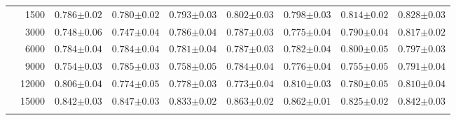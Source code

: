 \begin{table}[p]
\begin{tabularx}{\textwidth}{cr| *{7}{Y}}
        & 1500 & $0.786{\scriptscriptstyle\pm0.02}$ & $0.780{\scriptscriptstyle\pm0.02}$ & $0.793{\scriptscriptstyle\pm0.03}$ & $0.802{\scriptscriptstyle\pm0.03}$ & $0.798{\scriptscriptstyle\pm0.03}$ & $0.814{\scriptscriptstyle\pm0.02}$ & $0.828{\scriptscriptstyle\pm0.03}$ \\
        & 3000 & $0.748{\scriptscriptstyle\pm0.06}$ & $0.747{\scriptscriptstyle\pm0.04}$ & $0.786{\scriptscriptstyle\pm0.04}$ & $0.787{\scriptscriptstyle\pm0.03}$ & $0.775{\scriptscriptstyle\pm0.04}$ & $0.790{\scriptscriptstyle\pm0.04}$ & $0.817{\scriptscriptstyle\pm0.02}$ \\
        & 6000 & $0.784{\scriptscriptstyle\pm0.04}$ & $0.784{\scriptscriptstyle\pm0.04}$ & $0.781{\scriptscriptstyle\pm0.04}$ & $0.787{\scriptscriptstyle\pm0.03}$ & $0.782{\scriptscriptstyle\pm0.04}$ & $0.800{\scriptscriptstyle\pm0.05}$ & $0.797{\scriptscriptstyle\pm0.03}$ \\
        & 9000 & $0.754{\scriptscriptstyle\pm0.03}$ & $0.785{\scriptscriptstyle\pm0.03}$ & $0.758{\scriptscriptstyle\pm0.05}$ & $0.784{\scriptscriptstyle\pm0.04}$ & $0.776{\scriptscriptstyle\pm0.04}$ & $0.755{\scriptscriptstyle\pm0.05}$ & $0.791{\scriptscriptstyle\pm0.04}$ \\
        & 12000 & $0.806{\scriptscriptstyle\pm0.04}$ & $0.774{\scriptscriptstyle\pm0.05}$ & $0.778{\scriptscriptstyle\pm0.03}$ & $0.773{\scriptscriptstyle\pm0.04}$ & $0.810{\scriptscriptstyle\pm0.03}$ & $0.780{\scriptscriptstyle\pm0.05}$ & $0.810{\scriptscriptstyle\pm0.04}$ \\
        & 15000 & $0.842{\scriptscriptstyle\pm0.03}$ & $0.847{\scriptscriptstyle\pm0.03}$ & $0.833{\scriptscriptstyle\pm0.02}$ & $0.863{\scriptscriptstyle\pm0.02}$ & $0.862{\scriptscriptstyle\pm0.01}$ & $0.825{\scriptscriptstyle\pm0.02}$ & $0.842{\scriptscriptstyle\pm0.03}$ \\
         \\
    \end{tabularx}


\end{table}
